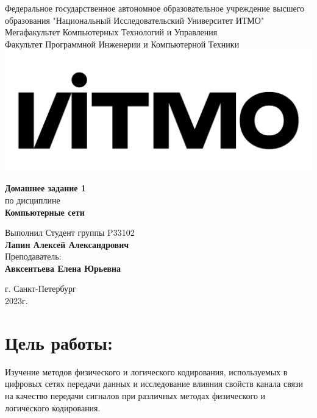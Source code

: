 \documentclass[12pt,onecolumn]{article}
\begin{document}
\setcounter{tocdepth}{4}
\begin{center}
    Федеральное государственное автономное образовательное учреждение высшего образования "Национальный Исследовательский Университет ИТМО"\\ 
    Мегафакультет Компьютерных Технологий и Управления\\
    Факультет Программной Инженерии и Компьютерной Техники \\
    \includegraphics[scale=0.3]{image/itmo.jpg} %
\end{center}
\vspace{1cm}


\begin{center}
    \textbf{Домашнее задание 1}\\
    по дисциплине\\
    \textbf{Компьютерные сети}
\end{center}

\vspace{2cm}

\begin{flushright}
  Выполнил Студент  группы P33102\\
  \textbf{Лапин Алексей Александрович}\\
  Преподаватель: \\
  \textbf{Авксентьева Елена Юрьевна}\\
\end{flushright}

\vspace{6cm}
\begin{center}
    г. Санкт-Петербург\\
    2023г.
\end{center}

\newpage
\tableofcontents
\newpage

\section*{Цель работы:}
Изучение методов физического и логического кодирования, используемых в цифровых сетях передачи данных и исследование влияния свойств канала связи на качество передачи сигналов при различных методах физического и логического кодирования.
\end{document}

